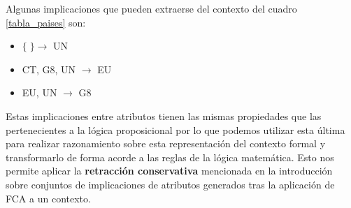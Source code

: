 	Algunas implicaciones que pueden extraerse del contexto del cuadro \ref{tabla_paises} son:
	
	\begin{itemize}
		\item $\{\;\} \rightarrow$ UN
		\item CT, G8, UN $\rightarrow$ EU
		\item EU, UN $\rightarrow$ G8 
	\end{itemize}

	Estas implicaciones entre atributos tienen las mismas propiedades que las pertenecientes a la lógica proposicional por lo que podemos utilizar esta última para realizar razonamiento sobre esta representación del contexto formal y transformarlo de forma acorde a las reglas de la lógica matemática. Esto nos permite aplicar la \textbf{retracción conservativa} mencionada en la introducción sobre conjuntos de implicaciones de atributos generados tras la aplicación de FCA a un contexto.

